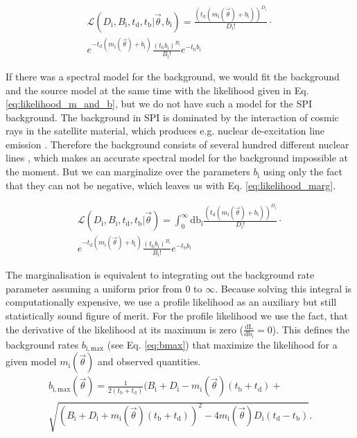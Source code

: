 \documentclass[twocolumn,traditabstract]{aa}
\begin{document}
\begin{multline}
	\mathcal{L}(D_{\mathrm{i}}, B_{\mathrm{i}},t_{\mathrm{d}},t_{\mathrm{b}}|\vec{\theta}, b_{\mathrm{i}}) = \frac{(t_{\mathrm{d}}(m_{\mathrm{i}}(\vec{\theta})+ b_{\mathrm{i}}))^{D_{\mathrm{i}}}}{D_{\mathrm{i}}!}\cdot \\
  e^{-t_{\mathrm{d}}(m_{\mathrm{i}}(\vec{\theta})+b_{\mathrm{i}})}\frac{(t_{\mathrm{b}} b_{\mathrm{i}})^{B_{\mathrm{i}}}}{B_{\mathrm{i}}!} e^{-t_{\mathrm{b}} b_{\mathrm{i}}}
  \label{eq:likelihood_m_and_b}
\end{multline}

If there was a spectral model for the background, we would fit the background and the source model at the same time with the likelihood given in Eq. \ref{eq:likelihood_m_and_b}, but we do not have such a model for the SPI background. The background in SPI is dominated by the interaction of cosmic rays in the satellite material, which produces e.g. nuclear de-excitation line emission \citep{spi_bkg}. Therefore the background consists of several hundred different nuclear lines \citep{spi_bkg}, which makes an accurate spectral model for the background impossible at the moment. But we can marginalize over the parameters $b_{\mathrm{i}}$ using only the fact that they can not be negative, which leaves us with Eq. \ref{eq:likelihood_marg}.

\begin{multline}
	\mathcal{L}(D_{\mathrm{i}}, B_{\mathrm{i}},t_{\mathrm{d}},t_{\mathrm{b}}|\vec{\theta}) = \int_{0}^{\infty}\textrm{db}_{\mathrm{i}}\frac{(t_{\mathrm{d}}(m_{\mathrm{i}}(\vec{\theta})+ b_{\mathrm{i}}))^{D_{\mathrm{i}}}}{D_{\mathrm{i}}!}\cdot\\
  e^{-t_{\mathrm{d}}(m_{\mathrm{i}}(\vec{\theta})+b_{\mathrm{i}})} \frac{(t_{\mathrm{b}} b_{\mathrm{i}})^{B_{\mathrm{i}}}}{B_{\mathrm{i}}!} e^{-t_{\mathrm{b}}b_{\mathrm{i}}}
  \label{eq:likelihood_marg}
\end{multline}

The marginalisation is equivalent to integrating out the background rate parameter assuming a uniform prior from 0 to $\infty$. Because solving this integral is computationally expensive, we use a profile likelihood as an auxiliary but still statistically sound figure of merit. For the profile likelihood we use the fact, that the derivative of the likelihood at its maximum is zero ($\frac{\textrm{dL}}{\textrm{db}_i}=0$). This defines the background rates $b_\mathrm{{i, max}}$ (see Eq. \ref{eq:bmax}) that maximize the likelihood for a given model $m_{\mathrm{i}}(\vec{\theta})$ and observed quantities.
\begin{multline}
	b_{\mathrm{i,max}}(\vec{\theta})=\frac{1}{2(t_{\mathrm{b}}+t_{\mathrm{d}})}(B_{\mathrm{i}}+D_{\mathrm{i}}-m_{\mathrm{i}}(\vec{\theta})(t_{\mathrm{b}}+t_{\mathrm{d}})+\\
  \sqrt{(B_{\mathrm{i}}+D_{\mathrm{i}}+m_{\mathrm{i}}(\vec{\theta})(t_{\mathrm{b}}+t_{\mathrm{d}}))^{2}-4m_{\mathrm{i}}(\vec{\theta})D_{\mathrm{i}}(t_{\mathrm{d}}-t_{\mathrm{b}})}.
  \label{eq:bmax}
\end{multline}
\end{document}
